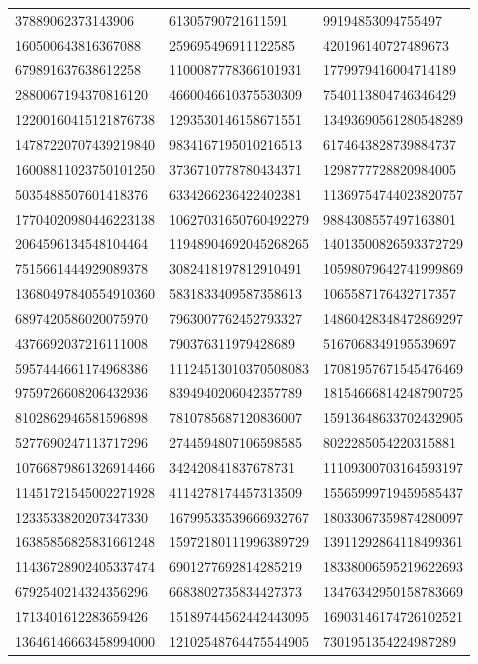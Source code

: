 \begin{longtable}{*{3}{l}}
37889062373143906&61305790721611591&99194853094755497\\
160500643816367088&259695496911122585&420196140727489673\\
679891637638612258&1100087778366101931&1779979416004714189\\
2880067194370816120&4660046610375530309&7540113804746346429\\
12200160415121876738&1293530146158671551&13493690561280548289\\
14787220707439219840&9834167195010216513&6174643828739884737\\
16008811023750101250&3736710778780434371&1298777728820984005\\
5035488507601418376&6334266236422402381&11369754744023820757\\
17704020980446223138&10627031650760492279&9884308557497163801\\
2064596134548104464&11948904692045268265&14013500826593372729\\
7515661444929089378&3082418197812910491&10598079642741999869\\
13680497840554910360&5831833409587358613&1065587176432717357\\
6897420586020075970&7963007762452793327&14860428348472869297\\
4376692037216111008&790376311979428689&5167068349195539697\\
5957444661174968386&11124513010370508083&17081957671545476469\\
9759726608206432936&8394940206042357789&18154666814248790725\\
8102862946581596898&7810785687120836007&15913648633702432905\\
5277690247113717296&2744594807106598585&8022285054220315881\\
10766879861326914466&342420841837678731&11109300703164593197\\
11451721545002271928&4114278174457313509&15565999719459585437\\
1233533820207347330&16799533539666932767&18033067359874280097\\
16385856825831661248&15972180111996389729&13911292864118499361\\
11436728902405337474&6901277692814285219&18338006595219622693\\
6792540214324356296&6683802735834427373&13476342950158783669\\
1713401612283659426&15189744562442443095&16903146174726102521\\
13646146663458994000&12102548764475544905&7301951354224987289\\

\end{longtable}
